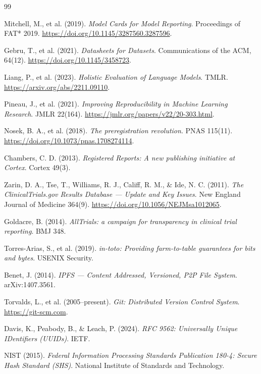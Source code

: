 \documentclass[11pt, a4paper]{article}
\begin{document}
\begin{thebibliography}{99}

Mitchell, M., et al. (2019). \emph{Model Cards for Model Reporting}. Proceedings of FAT* 2019. \url{https://doi.org/10.1145/3287560.3287596}.

Gebru, T., et al. (2021). \emph{Datasheets for Datasets}. Communications of the ACM, 64(12). \url{https://doi.org/10.1145/3458723}.

Liang, P., et al. (2023). \emph{Holistic Evaluation of Language Models}. TMLR. \url{https://arxiv.org/abs/2211.09110}.

Pineau, J., et al. (2021). \emph{Improving Reproducibility in Machine Learning Research}. JMLR 22(164). \url{https://jmlr.org/papers/v22/20-303.html}.

Nosek, B. A., et al. (2018). \emph{The preregistration revolution}. PNAS 115(11). \url{https://doi.org/10.1073/pnas.1708274114}.

Chambers, C. D. (2013). \emph{Registered Reports: A new publishing initiative at Cortex}. Cortex 49(3).

Zarin, D. A., Tse, T., Williams, R. J., Califf, R. M., \& Ide, N. C. (2011). \emph{The ClinicalTrials.gov Results Database --- Update and Key Issues}. New England Journal of Medicine 364(9). \url{https://doi.org/10.1056/NEJMsa1012065}.

Goldacre, B. (2014). \emph{AllTrials: a campaign for transparency in clinical trial reporting}. BMJ 348.

Torres-Arias, S., et al. (2019). \emph{in-toto: Providing farm-to-table guarantees for bits and bytes}. USENIX Security.

Benet, J. (2014). \emph{IPFS --- Content Addressed, Versioned, P2P File System}. arXiv:1407.3561.

Torvalds, L., et al. (2005--present). \emph{Git: Distributed Version Control System}. \url{https://git-scm.com}.

Davis, K., Peabody, B., \& Leach, P. (2024). \emph{RFC 9562: Universally Unique IDentifiers (UUIDs)}. IETF.

NIST (2015). \emph{Federal Information Processing Standards Publication 180-4: Secure Hash Standard (SHS)}. National Institute of Standards and Technology.


\end{thebibliography}
\end{document}
